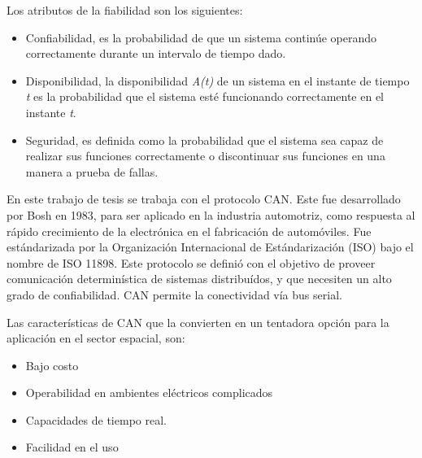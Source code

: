 Los atributos de la fiabilidad son los siguientes:
\begin{itemize}
\item Confiabilidad, es la probabilidad de que un sistema continúe operando correctamente
durante un intervalo de tiempo dado.
\item Disponibilidad, la disponibilidad \textit{A(t)} de un sistema en el
instante de tiempo \textit{t} es la probabilidad que el sistema esté funcionando correctamente en
el instante \textit{t}.
\item Seguridad, es definida como la probabilidad que el sistema sea capaz de realizar sus funciones correctamente o discontinuar sus funciones en una manera a prueba de fallas.
\end{itemize}

En este trabajo de tesis se trabaja con el protocolo CAN. Este fue desarrollado por Bosh en 1983, para ser aplicado en la industria automotriz, como respuesta al rápido crecimiento de la electrónica en el fabricación de automóviles. Fue estándarizada por la Organización Internacional de Estándarización (ISO) bajo el nombre de  ISO 11898. Este protocolo se definió con el objetivo de proveer comunicación determinística de sistemas distribuídos, y que necesiten un alto grado de confiabilidad. CAN permite la conectividad vía bus serial.

Las características de CAN que la convierten en un tentadora opción para la aplicación en el sector espacial, son:
\begin{itemize}
  \item Bajo costo
  \item Operabilidad en ambientes eléctricos complicados
  \item Capacidades de tiempo real.
  \item Facilidad en el uso
\end{itemize}
